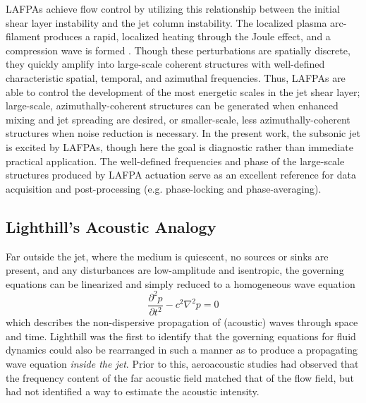 LAFPAs achieve flow control by utilizing this relationship between the initial shear layer instability and the jet column instability.
The localized plasma arc-filament produces a rapid, localized heating through the Joule effect, and a compression wave is formed \citep{Utkin2007}.
Though these perturbations are spatially discrete, they quickly amplify into large-scale coherent structures with well-defined characteristic spatial, temporal, and azimuthal frequencies.
Thus, LAFPAs are able to control the development of the most energetic scales in the jet shear layer; large-scale, azimuthally-coherent structures can be generated when enhanced mixing and jet spreading are desired, or smaller-scale, less azimuthally-coherent structures when noise reduction is necessary. 
In the present work, the subsonic jet is excited by LAFPAs, though here the goal is diagnostic rather than immediate practical application.
The well-defined frequencies and phase of the large-scale structures produced by LAFPA actuation serve as an excellent reference for data acquisition and post-processing (e.g. phase-locking and phase-averaging).

\subsection{Lighthill's Acoustic Analogy}
Far outside the jet, where the medium is quiescent, no sources or sinks are present, and any disturbances are low-amplitude and isentropic, the governing equations can be linearized and simply reduced to a homogeneous wave equation
\begin{equation}
	\frac{\partial^2 p}{\partial t^2} - c^2 \nabla ^2 p = 0
\end{equation}
which describes the non-dispersive propagation of (acoustic) waves through space and time.
Lighthill \citep{Lighthill1952} was the first to identify that the governing equations for fluid dynamics could also be rearranged in such a manner as to produce a propagating wave equation \textit{inside the jet}.
Prior to this, aeroacoustic studies had observed that the frequency content of the far acoustic field matched that of the flow field, but had not identified a way to estimate the acoustic intensity.

